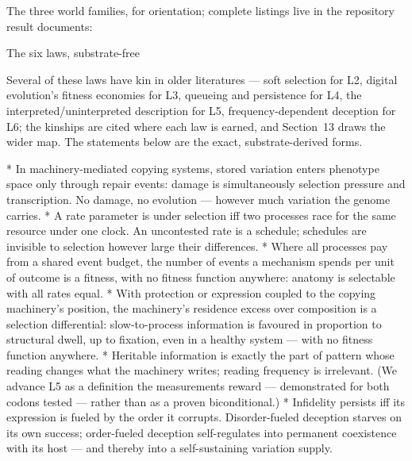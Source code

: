 \noindent The three world families, for orientation; complete
listings live in the repository result documents:

\medskip
\noindent{}
\medskip

\sec The six laws, substrate-free

\noindent Several of these laws have kin in older literatures ---
soft selection for L2, digital evolution's fitness economies for
L3, queueing and persistence for L4, the interpreted/uninterpreted
description for L5, frequency-dependent deception for L6; the
kinships are cited where each law is earned, and Section~13 draws
the wider map. The statements below are the exact,
substrate-derived forms.

\begitems
*  In machinery-mediated copying systems,
stored variation enters phenotype space only through repair
events: damage is simultaneously selection pressure and
transcription. No damage, no evolution --- however much variation
the genome carries.
*  A rate parameter is under selection iff two
processes race for the same resource under one clock. An
uncontested rate is a schedule; schedules are invisible to
selection however large their differences.
*  Where all processes pay from a
shared event budget, the number of events a mechanism spends per
unit of outcome is a fitness, with no fitness function anywhere:
anatomy is selectable with all rates equal.
*  With protection or expression coupled
to the copying machinery's position, the machinery's residence
excess over composition is a selection differential:
slow-to-process information is favoured in proportion to
structural dwell, up to fixation, even in a healthy system ---
with no fitness function anywhere.
*  Heritable information is exactly the
part of pattern whose reading changes what the machinery writes;
reading frequency is irrelevant. (We advance L5 as a definition
the measurements reward --- demonstrated for both codons tested
--- rather than as a proven biconditional.)
*  Infidelity persists iff its expression is
fueled by the order it corrupts. Disorder-fueled deception starves
on its own success; order-fueled deception self-regulates into
permanent coexistence with its host --- and thereby into a
self-sustaining variation supply.
\enditems

